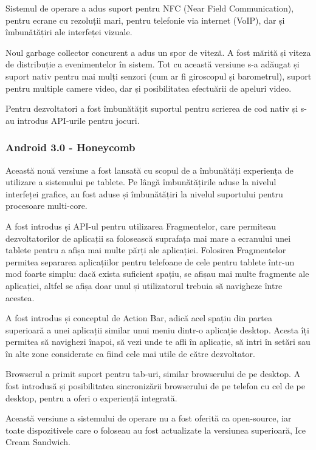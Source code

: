 \documentclass[12pt,a4paper]{article}
\begin{document}
	Sistemul de operare a adus suport pentru NFC (Near Field Communication), pentru ecrane cu rezoluții mari, pentru telefonie via internet (VoIP), dar și îmbunătățiri ale interfeței vizuale.

	Noul garbage collector concurent a adus un spor de viteză. A fost mărită și viteza de distribuție a evenimentelor în sistem. Tot cu această versiune s-a adăugat și suport nativ pentru mai mulți senzori (cum ar fi giroscopul și barometrul), suport pentru multiple camere video, dar și posibilitatea efectuării de apeluri video.

	Pentru dezvoltatori a fost îmbunătățit suportul pentru scrierea de cod nativ și s-au introdus API-urile pentru jocuri.


\subsubsection{Android 3.0 - Honeycomb}
Această nouă versiune a fost lansată cu scopul de a îmbunătăți experiența de utilizare a sistemului pe tablete. Pe lângă îmbunătățirile aduse la nivelul interfeței grafice, au fost aduse și îmbunătățiri la nivelul suportului pentru procesoare multi-core.

	A fost introdus și API-ul pentru utilizarea Fragmentelor, care permiteau dezvoltatorilor de aplicații sa folosească suprafața mai mare a ecranului unei tablete pentru a afișa mai multe părți ale aplicației. Folosirea Fragmentelor permitea separarea aplicațiilor pentru telefoane de cele pentru tablete într-un mod foarte simplu: dacă exista suficient spațiu, se afișau mai multe fragmente ale aplicației, altfel se afișa doar unul și utilizatorul trebuia să navigheze între acestea.

	A fost introdus și conceptul de Action Bar, adică acel spațiu din partea superioară a unei aplicații similar unui meniu dintr-o aplicație desktop. Acesta îți permitea să navighezi înapoi, să vezi unde te afli în aplicație, să intri în setări sau în alte zone considerate ca fiind cele mai utile de către dezvoltator.

	Browserul a primit suport pentru tab-uri, similar browserului de pe desktop. A fost introdusă și posibilitatea sincronizării browserului de pe telefon cu cel de pe desktop, pentru a oferi o experiență integrată.

	Această versiune a sistemului de operare nu a fost oferită ca open-source, iar toate dispozitivele care o foloseau au fost actualizate la versiunea superioară, Ice Cream Sandwich.
\end{document}
